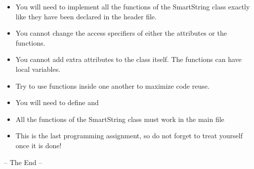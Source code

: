 \documentclass[a4paper,12pt]{article}
\begin{document}
	\begin{itemize}
		\item You will need to implement all the functions of the SmartString class exactly like they have been declared in the header file.
		\item  You cannot change the access specifiers of either the attributes or the functions.
		\item You cannot add extra attributes to the class itself. The functions can have local variables.
		\item Try to use functions inside one another to maximize code reuse.
		\item You will need to define  and 
		\item All the functions of the SmartString class must work in the main file
		\item This is the last programming assignment, so do not forget to treat yourself once it is done!
	\end{itemize}
	
	\begin{center}
		-- The End --
	\end{center}
	\newpage
	
	
\end{document}
